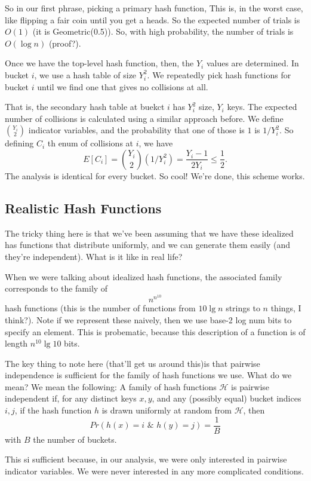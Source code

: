 \documentclass{article}
\begin{document}
So in our first phrase, picking a primary hash function,
This is, in the worst case, like flipping a fair coin until you get
a heads.
So the expected number of trials is $O(1)$ (it is Geometric(0.5)).
So, with high probability, the number of trials is $O(\log n)$ (proof?).

Once we have the top-level hash function, then, the $Y_i$ values are determined.
In bucket $i$, we use a hash table of size $Y_i^2$.
We repeatedly pick hash functions for bucket $i$ until we find one
that gives no collisions at all.

That is, the secondary hash table at buekct $i$ has $Y_i^2$ size, $Y_i$ keys.
The expected number of collisions is calculated using a similar approach
before.
We define ${Y_i\choose 2}$ indicator variables, and the probability that
one of those is $1$ is $1 / Y_i^2$.
So defining $C_i$ th enum of collisions at $i$, we have
$$
E[C_i] = 
{Y_i\choose 2} (1 / Y_i^2)
=
\frac{Y_i - 1}{2Y_i}
\leq \frac{1}{2}.
$$
The analysis is identical for every bucket.
So cool! We're done, this scheme works.

\subsection{Realistic Hash Functions}

The tricky thing here is that we've been assuming that we have these
idealized has functions that distribute uniformly, and we can generate
them easily (and they're independent).
What is it like in real life?


When we were talking about idealized hash functions, the associated
family corresponds to the family of
$$
n^{n^{10}}
$$
hash functions (this is the number of functions from $10\lg n$ strings to
$n$ things, I think?).
Note if we represent these naively, then we use base-2 log num bits to
specify an element.
This is probematic, because this description of a function is of 
length $n^{10}\lg 10$ bits.

The key thing to note here (that'll get us around this)is that pairwise 
independence is sufficient
for the family of hash functions we use.
What do we mean?
We mean the following:
A family of hash functions $\mathcal H$ is pairwise independent if,
for any distinct keys $x,y$, and any (possibly equal) bucket
indices $i,j$, if the hash function $h$ is drawn uniformly at random
from $\mathcal H$,
then
$$
Pr(h(x) = i\,\,\&\,\, h(y) = j)
=
\frac{1}{B}
$$
with $B$ the number of buckets.

This si sufficient because, in our analysis, we were only interested in
pairwise indicator variables. 
We were never interested in any more complicated conditions.
\end{document}
